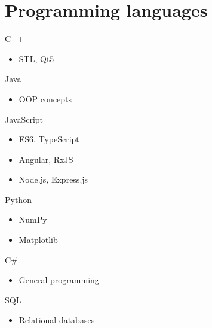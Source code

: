 \documentclass[11pt,a4paper,sans]{moderncv}			%
\begin{document}





\section{Programming languages}

\cvdoubleitem
{C++}{
\begin{itemize}
	\item STL, Qt5
\end{itemize}
}
{Java}{
\begin{itemize}
	\item OOP concepts
\end{itemize}
}

\cvdoubleitem
{JavaScript}{
\begin{itemize}
	\item ES6, TypeScript
	\item Angular, RxJS
	\item Node.js, Express.js
\end{itemize}}
{Python}{
\begin{itemize}
	\item NumPy
	\item Matplotlib
\end{itemize}
}

\cvdoubleitem
{C\#}{
\begin{itemize}
	\item General programming
\end{itemize}
}
{SQL}{
\begin{itemize}
	\item Relational databases
\end{itemize}
}
\end{document}

